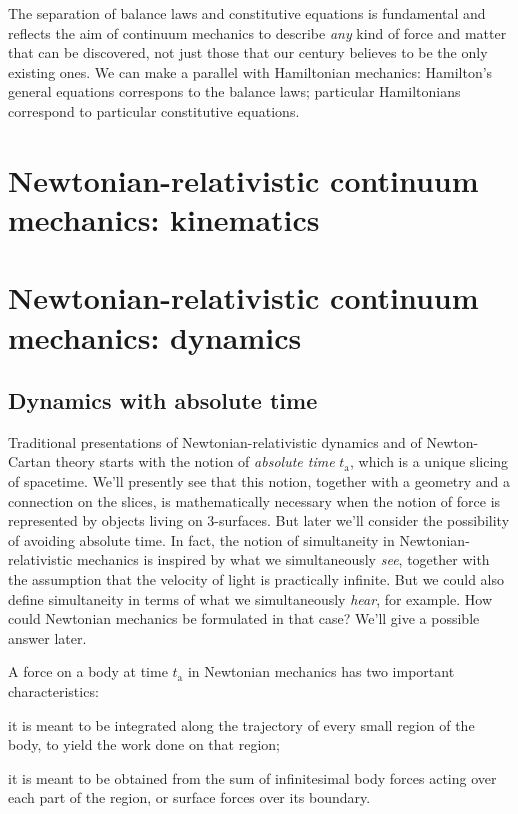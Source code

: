 \documentclass[\ifafour a4paper,12pt,\else a5paper,10pt,\fi%
onecolumn,oneside,article,%
british%
]{memoir}
\theoremstyle{remark}
\theoremstyle{innote}
\renewcommand*{\|}{\nonscript\,\vert\nonscript\;\mathopen{}}
\newcommand*{\ytn}{t_{\textrm{a}}}
\begin{document}
The separation of balance laws and constitutive equations is fundamental
and reflects the aim of continuum mechanics to describe \emph{any} kind of
force and matter that can be discovered, not just those that our century
believes to be the only existing ones. We can make a parallel with
Hamiltonian mechanics: Hamilton's general equations correspons to the
balance laws; particular Hamiltonians correspond to particular constitutive
equations.



\section{Newtonian-relativistic continuum mechanics: kinematics}
\label{sec:newton_kinematics}


\section{Newtonian-relativistic continuum mechanics: dynamics}
\label{sec:newton_dynamics}

\subsection{Dynamics with absolute time}
\label{sec:newton_dynamics_absolute_time}

Traditional presentations of Newtonian-relativistic dynamics and of
Newton-Cartan theory starts with the notion of \emph{absolute time} $\ytn$,
which is a unique slicing of spacetime. We'll presently see that this
notion, together with a geometry and a connection on the slices, is
mathematically necessary when the notion of force is represented by objects
living on 3-surfaces. But later we'll consider the possibility of avoiding
absolute time. In fact, the notion of simultaneity in
Newtonian-relativistic mechanics is inspired by what we simultaneously
\emph{see}, together with the assumption that the velocity of light is
practically infinite. But we could also define simultaneity in terms of
what we simultaneously \emph{hear}, for example. How could Newtonian
mechanics be formulated in that case? We'll give a possible answer later.

A force on a body at time $\ytn$ in Newtonian mechanics has two important
characteristics:
\begin{enumerate*}[label=(\arabic*)]
\item it is meant to be integrated along the trajectory of every small
  region of the body, to yield the work done on that region;
\item it is meant to be obtained from the sum of infinitesimal body forces
  acting over each part of the region, or surface forces over its boundary.
\end{enumerate*}
\end{document}
